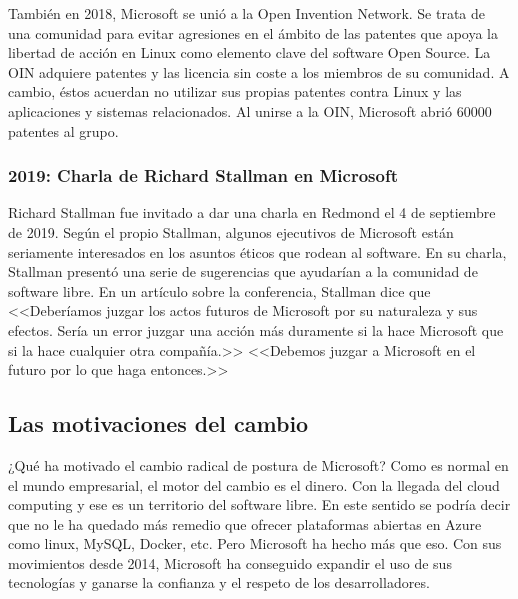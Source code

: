 También en 2018, Microsoft se unió a la Open Invention Network. Se trata de una comunidad para evitar agresiones en el ámbito de las patentes que apoya la libertad de acción en Linux como elemento clave del software Open Source. La OIN adquiere patentes y las licencia sin coste a los miembros de su comunidad. A cambio, éstos acuerdan no utilizar sus propias patentes contra Linux y las aplicaciones y sistemas relacionados\cite{wiki_2020:open_invention_network}. Al unirse a la OIN, Microsoft abrió 60000 patentes al grupo\cite{azure_blogs_2018:microsoft_oin}.

\subsubsection{2019: Charla de Richard Stallman en Microsoft}
Richard Stallman fue invitado a dar una charla en Redmond el 4 de septiembre de 2019. Según el propio Stallman, algunos ejecutivos de Microsoft están seriamente interesados en los asuntos éticos que rodean al software. En su charla, Stallman presentó una serie de sugerencias que ayudarían a la comunidad de software libre. En un artículo sobre la conferencia, Stallman dice que <<Deberíamos juzgar los actos futuros de Microsoft por su naturaleza y sus efectos. Sería un error juzgar una acción más duramente si la hace Microsoft que si la hace cualquier otra compañía.>> <<Debemos juzgar a Microsoft en el futuro por lo que haga entonces.>> \cite{stallman_2019}

\subsection{Las motivaciones del cambio}
¿Qué ha motivado el cambio radical de postura de Microsoft? Como es normal en el mundo empresarial, el motor del cambio es el dinero. Con la llegada del cloud computing y ese es un territorio del software libre. En este sentido se podría decir que no le ha quedado más remedio que ofrecer plataformas abiertas en Azure como linux, MySQL, Docker, etc. Pero Microsoft ha hecho más que eso. Con sus movimientos desde 2014, Microsoft ha conseguido expandir el uso de sus tecnologías y ganarse la confianza y el respeto de los desarrolladores.